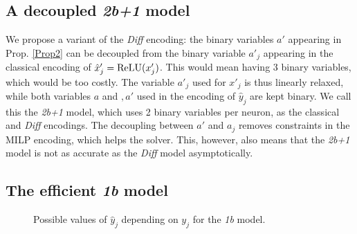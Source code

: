 	\fi
	

 


	
    
    
    


    \subsection{A decoupled {\em 2b+1} model}

	We propose a variant of the {\em Diff} encoding: 
	the binary variables $a'$ appearing in 
    Prop. \ref{Prop2} can be decoupled from the binary variable $a'_j$
	appearing in the classical encoding of $\hat{x}'_j = \mathrm{ReLU}(x'_j)$. 
	This would mean having 3 binary variables, which would be too costly. 
	The variable $a'_j$ used for $x'_j$ is thus linearly relaxed, while
	both variables $ a$ and $,a'$ used in the encoding of $\hat{y}_j$ are kept binary. We call this the {\em 2b+1} model, which uses 2 binary variables per neuron, 
	as the classical and {\em Diff} encodings.
	The decoupling between $a'$ and $a_j$ removes constraints in the MILP encoding, which helps the solver. This, however, also means that the {\em 2b+1} model is not as accurate as the {\em Diff} model asymptotically.


	\subsection{The efficient {\em 1b} model}
	\label{s.1b}

		\begin{figure}[b!]
		\centering
\caption{Possible values of $\hat{y}_j$ depending on $y_j$ for the {\em 1b} model.}
	\label{fig.1v}
\end{figure}



